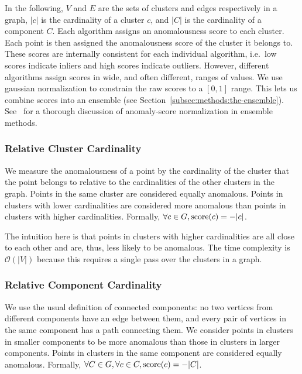 In the following,
$V$ and $E$ are the sets of clusters and edges respectively in a graph,
$|c|$ is the cardinality of a cluster $c$,
and $|C|$ is the cardinality of a component $C$.
Each algorithm assigns an anomalousness score to each cluster.
Each point is then assigned the anomalousness score of the cluster it belongs to.
These scores are internally consistent for each individual algorithm, i.e.\ low scores indicate inliers and high scores indicate outliers.
However, different algorithms assign scores in wide, and often different, ranges of values.
We use gaussian normalization to constrain the raw scores to a $[0, 1]$ range.
This lets us combine scores into an ensemble (see Section~\ref{subsec:methods:the-ensemble}).
See~\cite{kriegel2011interpreting} for a thorough discussion of anomaly-score normalization in ensemble methods.

\subsubsection{Relative Cluster Cardinality}
\label{subsubsec:methods:individual-algorithms:relative-cluster-cardinality}
We measure the anomalousness of a point by the cardinality of the cluster that the point belongs to relative to the cardinalities of the other clusters in the graph.
Points in the same cluster are considered equally anomalous.
Points in clusters with lower cardinalities are considered more anomalous than points in clusters with higher cardinalities.
Formally, $\forall c \in G, \operatorname{score}(c) = -|c|$.

The intuition here is that points in clusters with higher cardinalities are all close to each other and are, thus, less likely to be anomalous.
The time complexity is $\mathcal{O}(|V|)$ because this requires a single pass over the clusters in a graph.

\subsubsection{Relative Component Cardinality}
\label{subsubsec:methods:individual-algorithms:relative-component-cardinality}
We use the usual definition of connected components:
no two vertices from different components have an edge between them, and
every pair of vertices in the same component has a path connecting them.
We consider points in clusters in smaller components to be more anomalous than those in clusters in larger components.
Points in clusters in the same component are considered equally anomalous.
Formally, $\forall C \in G, \forall c \in C, \operatorname{score}(c) = -|C|$.

